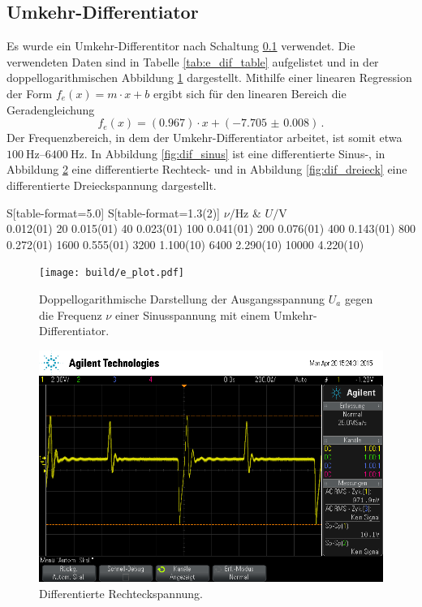 \subsection{Umkehr-Differentiator}
Es wurde ein Umkehr-Differentitor nach Schaltung \ref{} verwendet.
Die verwendeten Daten sind in Tabelle \ref{tab:e_dif_table} aufgelistet und in der doppellogarithmischen Abbildung \ref{fig:e_dif_fig} dargestellt.
Mithilfe einer linearen Regression der Form $f_{e}(x) = m \cdot x + b$ ergibt sich für den linearen Bereich die Geradengleichung
\begin{equation*}
    f_{e}(x) = (\num{0.967}) \cdot x + (\num{-7.705(8)})\,.
\end{equation*}
Der Frequenzbereich, in dem der Umkehr-Differentiator arbeitet, ist somit etwa $\SIrange{100}{6400}{\hertz}$.
In Abbildung \ref{fig:dif_sinus} ist eine differentierte Sinus-, in Abbildung \ref{fig:dif_rechteck} eine differentierte Rechteck- und in Abbildung \ref{fig:dif_dreieck} eine differentierte Dreieckspannung dargestellt.

\begin{table}[!h]
    \centering
    \caption{Aufgenommene Ausgangsspannungen $U_a$ einer Sinusspannung in Abhängigkeit der Frequenz $\nu$ mit einem Umkehr-Differentiator.}
    \label{tab:e_dif_table}
    \begin{tabular}{S[table-format=5.0] S[table-format=1.3(2)]}
    \toprule 
        {$\nu/\si{\hertz}$} & {$U/\si{\volt}$} \\
       0.012(01)
           20   0.015(01)
           40   0.023(01)
          100   0.041(01)
          200   0.076(01)
          400   0.143(01)
          800   0.272(01)
         1600   0.555(01)
         3200   1.100(10)
         6400   2.290(10)
        10000   4.220(10)
    \bottomrule
    \end{tabular}
\end{table}

\begin{figure}[!h]
    \centering
    \texttt{[image: build/e\_plot.pdf]}
    \caption{Doppellogarithmische Darstellung der Ausgangsspannung $U_a$ gegen die Frequenz $\nu$ einer Sinusspannung mit einem Umkehr-Differentiator.}
    \label{fig:e_dif_fig}
\end{figure}


\begin{figure}[!h]
    \centering
    \includegraphics[width=0.8\linewidth]{data/scope_8.png}
    \caption{Differentierte Rechteckspannung.}
    \label{fig:dif_rechteck}
\end{figure}

